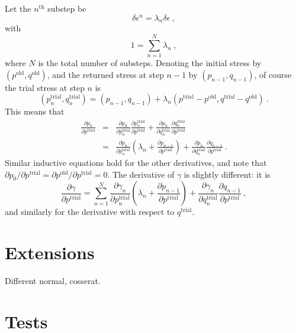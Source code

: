 \documentclass[]{scrreprt}
\begin{document}
Let the $n^{\mathrm{th}}$ substep be
\begin{equation}
\delta\epsilon^{n} = \lambda_{n}\delta\epsilon \ ,
\end{equation}
with
\begin{equation}
1 = \sum_{n=1}^{N}\lambda_{n} \ ,
\end{equation}
where $N$ is the total number of substeps.  Denoting the initial
stress by $(p^{\mathrm{old}}, q^{\mathrm{old}})$, and the returned
stress at step $n-1$ by $(p_{n-1}, q_{n-1})$, of course the trial
stress at step $n$ is
\begin{equation}
(p_{n}^{\mathrm{trial}}, q_{n}^{\mathrm{trial}}) = (p_{n-1},q_{n-1}) +
  \lambda_{n} ( p^{\mathrm{trial}} - p^{\mathrm{old}},
    q^{\mathrm{trial}} - q^{\mathrm{old}}) \ .
\end{equation}
This means that
\begin{eqnarray}
\frac{\partial p_{n}}{\partial p^{\mathrm{trial}}} & = &
\frac{\partial p_{n}}{\partial p_{n}^{\mathrm{trial}}}
\frac{\partial p_{n}^{\mathrm{trial}}}{\partial p^{\mathrm{trial}}}
+ \frac{\partial p_{n}}{\partial q_{n}^{\mathrm{trial}}}
\frac{\partial q_{n}^{\mathrm{trial}}}{\partial p^{\mathrm{trial}}} \\
& = & \frac{\partial p_{n}}{\partial p_{n}^{\mathrm{trial}}}
\left(\lambda_{n} + \frac{\partial p_{n-1}}{\partial p^{\mathrm{trial}}}
\right)
+ \frac{\partial p_{n}}{\partial q_{n}^{\mathrm{trial}}}
\frac{\partial q_{n-1}}{\partial p^{\mathrm{trial}}} \ .
\end{eqnarray}
Similar inductive equations hold for the other derivatives, and note
that $\partial p_{0}/\partial p^{\mathrm{trial}} = \partial
p^{\mathrm{old}}/\partial p^{\mathrm{trial}} = 0$.  The derivative of
$\gamma$ is slightly different: it is
\begin{equation}
\frac{\partial \gamma}{\partial p^{\mathrm{trial}}} = \sum_{n=1}^{N}
\frac{\partial \gamma_{n}}{\partial p_{n}^{\mathrm{trial}}}
\left(\lambda_{n} + \frac{\partial p_{n-1}}{\partial p^{\mathrm{trial}}}
\right)
+ \frac{\partial \gamma_{n}}{\partial q_{n}^{\mathrm{trial}}}
\frac{\partial q_{n-1}}{\partial p^{\mathrm{trial}}} \ ,
\end{equation}
and similarly for the derivative with respect to $q^{\mathrm{trial}}$.



\chapter{Extensions}

Different normal, cosserat.

\chapter{Tests}
\end{document}
